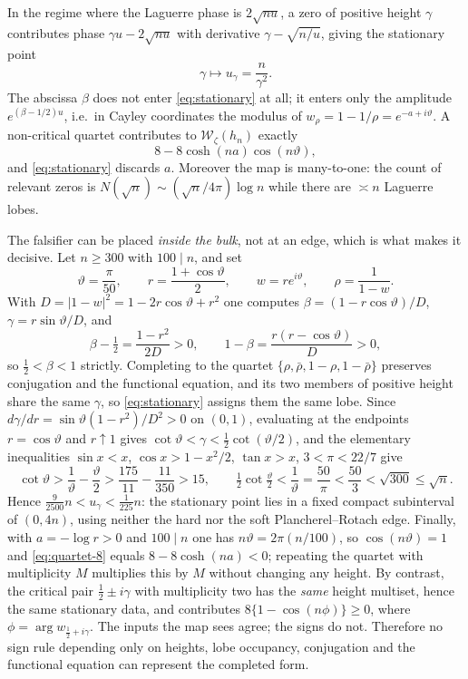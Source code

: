 \documentclass[11pt]{amsart}
\theoremstyle{definition}
\theoremstyle{remark}
\theoremstyle{definition}
\newcommand{\half}{\tfrac{1}{2}}
\newcommand{\gam}{\gamma}
\begin{document}
\noindent In the regime where the Laguerre phase is $2\sqrt{nu}$, a zero of positive height
$\gam$ contributes phase $\gam u-2\sqrt{nu}$ with derivative $\gam-\sqrt{n/u}$, giving the
stationary point
\begin{equation}\label{eq:stationary}
   \gam\longmapsto u_\gam=\frac{n}{\gam^2}.
\end{equation}
The abscissa $\beta$ does not enter \eqref{eq:stationary} at all; it enters only the amplitude
$e^{(\beta-1/2)u}$, i.e.\ in Cayley coordinates the modulus of
$w_\rho=1-1/\rho=e^{-a+i\vartheta}$. A non-critical quartet contributes to
$\mathcal W_\zeta(h_n)$ exactly
\begin{equation}\label{eq:quartet-8}
   8-8\cosh(na)\cos(n\vartheta),
\end{equation}
and \eqref{eq:stationary} discards $a$. Moreover the map is many-to-one: the count of relevant
zeros is $N(\sqrt n)\sim(\sqrt n/4\pi)\log n$ while there are $\asymp n$ Laguerre lobes.

The falsifier can be placed \emph{inside the bulk}, not at an edge, which is what makes it
decisive. Let $n\ge300$ with $100\mid n$, and set
\begin{equation}\label{eq:m3-quartet}
   \vartheta=\frac{\pi}{50},\qquad
   r=\frac{1+\cos\vartheta}{2},\qquad
   w=re^{i\vartheta},\qquad \rho=\frac{1}{1-w}.
\end{equation}
With $D=|1-w|^2=1-2r\cos\vartheta+r^2$ one computes
$\beta=(1-r\cos\vartheta)/D$, $\gam=r\sin\vartheta/D$, and
\[
   \beta-\tfrac12=\frac{1-r^2}{2D}>0,\qquad
   1-\beta=\frac{r(r-\cos\vartheta)}{D}>0 ,
\]
so $\half<\beta<1$ strictly. Completing to the quartet
$\{\rho,\bar\rho,1-\rho,1-\bar\rho\}$ preserves conjugation and the functional equation, and its
two members of positive height share the same $\gam$, so \eqref{eq:stationary} assigns them the
same lobe. Since $d\gam/dr=\sin\vartheta(1-r^2)/D^2>0$ on $(0,1)$, evaluating at the endpoints
$r=\cos\vartheta$ and $r\uparrow1$ gives $\cot\vartheta<\gam<\tfrac12\cot(\vartheta/2)$, and the
elementary inequalities $\sin x<x$, $\cos x>1-x^2/2$, $\tan x>x$, $3<\pi<22/7$ give
\[
   \cot\vartheta>\frac1\vartheta-\frac\vartheta2>\frac{175}{11}-\frac{11}{350}>15,
   \qquad
   \tfrac12\cot\tfrac\vartheta2<\frac1\vartheta=\frac{50}{\pi}<\frac{50}{3}<\sqrt{300}\le\sqrt n .
\]
Hence $\tfrac{9}{2500}n<u_\gam<\tfrac{1}{225}n$: the stationary point lies in a fixed compact
subinterval of $(0,4n)$, using neither the hard nor the soft Plancherel--Rotach edge. Finally,
with $a=-\log r>0$ and $100\mid n$ one has $n\vartheta=2\pi(n/100)$, so $\cos(n\vartheta)=1$ and
\eqref{eq:quartet-8} equals $8-8\cosh(na)<0$; repeating the quartet with multiplicity $M$
multiplies this by $M$ without changing any height. By contrast, the critical pair
$\half\pm i\gam$ with multiplicity two has the \emph{same} height multiset, hence the same
stationary data, and contributes $8\{1-\cos(n\phi)\}\ge0$, where $\phi=\arg w_{\half+i\gam}$. The inputs the map sees agree; the
signs do not. Therefore no sign rule depending only on heights, lobe occupancy, conjugation and
the functional equation can represent the completed form.
\end{document}
